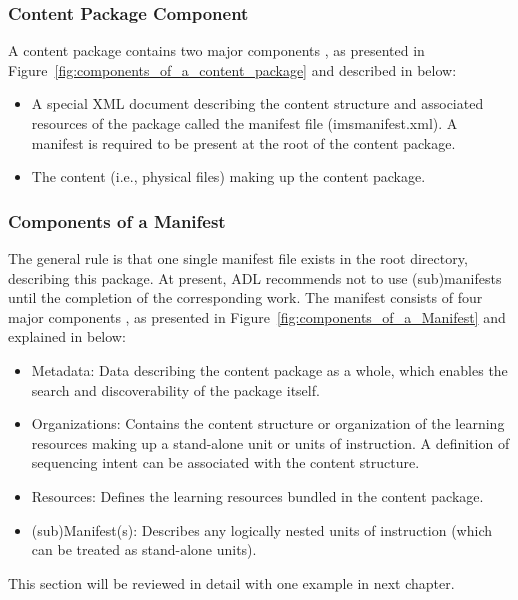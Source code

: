 \subsubsection{Content Package Component}
A content package contains two major components \cite{cambook}, as presented in Figure~\ref{fig:components_of_a_content_package} and described in 
below:
\begin{itemize}
	\item A special XML document describing the content structure and associated resources of the package called the manifest file (imsmanifest.xml). 
		A manifest is required to be present at the root of the content package.
	\item The content (i.e., physical files) making up the content package.
\end{itemize}
\subsubsection{Components of a Manifest}
The general rule is that one single manifest file exists in the root directory, describing this package. At present, ADL recommends not to use 
(sub)manifests until the completion of the corresponding work. The manifest consists of four major components \cite{cambook}, as presented in 
Figure~\ref{fig:components_of_a_Manifest} and explained in below:
\begin{itemize}
	\item Metadata: Data describing the content package as a whole, which enables the search and discoverability of the package itself.
	\item Organizations: Contains the content structure or organization of the learning resources making up a stand-alone unit or units of 
		instruction. A definition of sequencing intent can be associated with the content structure.
	\item Resources: Defines the learning resources bundled in the content package.
	\item (sub)Manifest(s): Describes any logically nested units of instruction (which can be treated as stand-alone units).
\end{itemize}
This section will be reviewed in detail with one example in next chapter.
